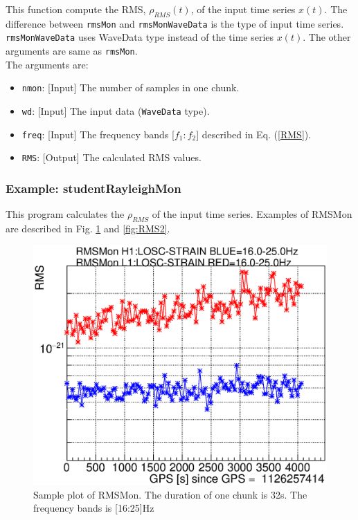 This function compute the RMS, $\rho_{RMS}(t)$, of the input time series $x(t)$.
The difference between {\tt rmsMon} and {\tt rmsMonWaveData} is the type of input time series.
{\tt rmsMonWaveData} uses WaveData type instead of the time series $x(t)$.
The other arguments are same as {\tt rmsMon}.\\
The arguments are:
\begin{itemize}
\item {\tt nmon}: [Input] The number of samples in one chunk.
\item {\tt wd}: [Input] The input data ({\tt WaveData} type).
\item {\tt freq}: [Input] The frequency bands [$f_1:f_2$] described in Eq. (\ref{RMS}). 
\item {\tt {RMS}}: [Output] The calculated RMS values. 
\end{itemize}


\subsubsection{{\bf Example:} studentRayleighMon}
This program calculates the $\rho_{RMS}$ of the input time series.
Examples of RMSMon are described in Fig. \ref{fig:RMS1} and \ref{fig:RMS2}.


\begin{figure}[ht]
  \begin{center}
    \includegraphics[width=0.9\hsize]{./fig/RMSMon/sample_16-25.eps}
    \caption{Sample plot of RMSMon. The duration of one chunk is 32s. The frequency bands is [16:25]Hz}
     \label{fig:RMS1}
  \end{center}
\end{figure}

